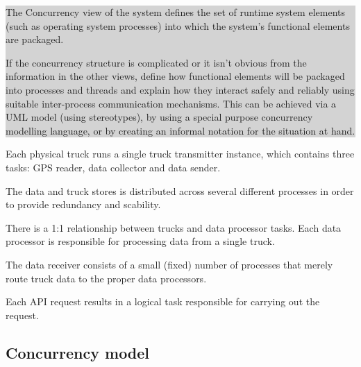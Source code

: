 \documentclass[a4paper,11pt]{report}
\newcommand{\instructions}[1]{
  \noindent\colorbox{lightgray}{%
    \parbox{\linewidth}{%
      #1
    }%
  }%
 \vspace{0.1cm}
}
\begin{document}
\instructions{
The Concurrency view of the system defines the set of runtime system
elements (such as operating system processes) into which the system’s
functional elements are packaged.

If the concurrency structure is complicated or it isn’t obvious from
the information in the other views, define how functional elements
will be packaged into processes and threads and explain how they
interact safely and reliably using suitable inter-process
communication mechanisms. This can be achieved via a UML model (using
stereotypes), by using a special purpose concurrency modelling
language, or by creating an informal notation for the situation at
hand.
}

Each physical truck runs a single truck transmitter instance, which
contains three tasks: GPS reader, data collector and data sender.

The data and truck stores is distributed across several different
processes in order to provide redundancy and scability.

There is a 1:1 relationship between trucks and data processor tasks.
Each data processor is responsible for processing data from a single
truck.

The data receiver consists of a small (fixed) number of processes that
merely route truck data to the proper data processors.

Each API request results in a logical task responsible for carrying
out the request.

\subsection{Concurrency model}
\label{sec:concurrency-model}
\end{document}
